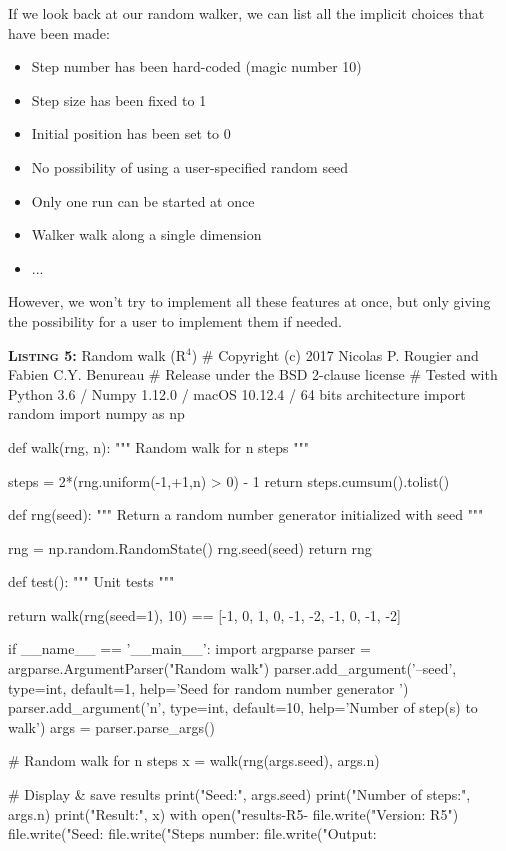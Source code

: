 \documentclass[a4paper,11pt]{article}
\begin{document}
If we look back at our random walker, we can list all the implicit choices that have been made:
\begin{itemize}
\item Step number has been hard-coded (magic number 10)
\item Step size has been fixed to 1
\item Initial position has been set to 0
\item No possibility of using a user-specified random seed
\item Only one run can be started at once
\item Walker walk along a single dimension
\item ...
\end{itemize}
However, we won't try to implement all these features at once, but only giving the possibility for a user to implement them if needed.


\begin{code}{\textbf{\textsc{Listing 5:}} Random walk (R$^4$)}
# Copyright (c) 2017 Nicolas P. Rougier and Fabien C.Y. Benureau
# Release under the BSD 2-clause license
# Tested with Python 3.6 / Numpy 1.12.0 / macOS 10.12.4 / 64 bits architecture
import random
import numpy as np

def walk(rng, n):
    """ Random walk for n steps """

    steps = 2*(rng.uniform(-1,+1,n) > 0) - 1
    return steps.cumsum().tolist()

def rng(seed):
    """ Return a random number generator initialized with seed """ 
    
    rng = np.random.RandomState()
    rng.seed(seed)
    return rng

def test():
    """ Unit tests """

    return walk(rng(seed=1), 10) == [-1, 0, 1, 0, -1, -2, -1, 0, -1, -2]

if __name__ == '__main__':
    import argparse
    parser = argparse.ArgumentParser("Random walk")
    parser.add_argument('--seed', type=int, default=1,
                        help='Seed for random number generator ')
    parser.add_argument('n', type=int, default=10,
                        help='Number of step(s) to walk')
    args = parser.parse_args()

    # Random walk for n steps
    x = walk(rng(args.seed), args.n)

    # Display & save results
    print("Seed:", args.seed)
    print("Number of steps:", args.n)
    print("Result:",  x)
    with open("results-R5-%
        file.write("Version: R5")
        file.write("Seed: %
        file.write("Steps number: %
        file.write("Output: %
\end{code}
\end{document}
